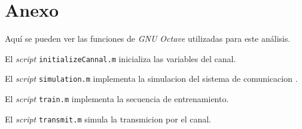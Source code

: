 \documentclass{article}
\begin{document}
\clearpage

\section{Anexo}
\par Aquí se pueden ver las funciones de \textit{GNU Octave} utilizadas para este análisis.\\

\par El \textit{script} \verb+initializeCannal.m+ inicializa las variables del canal.

\begin{ttfamily}
\begin{center}
\end{center}
\end{ttfamily}

\par El \textit{script} \verb+simulation.m+ implementa la simulacion del sistema de comunicacion .

\begin{ttfamily}
\begin{center}
\end{center}
\end{ttfamily}

\par El \textit{script} \verb+train.m+ implementa la secuencia de entrenamiento.

\begin{ttfamily}
\begin{center}
\end{center}
\end{ttfamily}

\par El \textit{script} \verb+transmit.m+ simula la transmicion por el canal.

\begin{ttfamily}
\begin{center}
\end{center}
\end{ttfamily}
\end{document}
